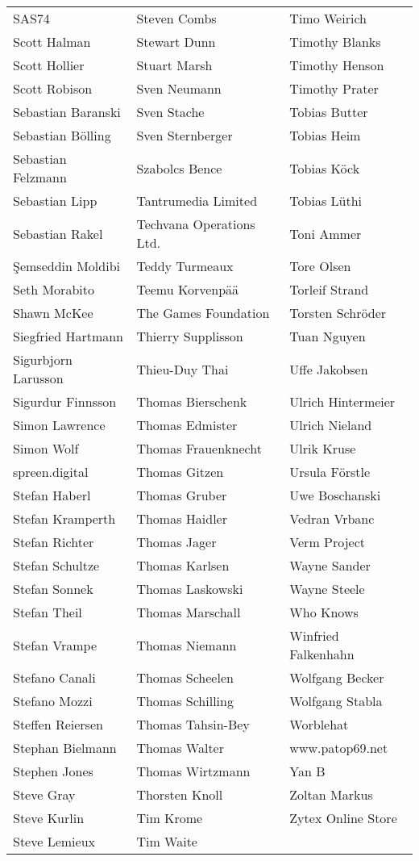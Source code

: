 \begin{tabular}{p{4.5cm}p{4.5cm}p{4.5cm}}
SAS74 & Steven Combs & Timo Weirich \\
Scott Halman & Stewart Dunn & Timothy Blanks \\
Scott Hollier & Stuart Marsh & Timothy Henson \\
Scott Robison & Sven Neumann & Timothy Prater \\
Sebastian Baranski & Sven Stache & Tobias Butter \\
Sebastian Bölling & Sven Sternberger & Tobias Heim \\
Sebastian Felzmann & Szabolcs Bence & Tobias Köck \\
Sebastian Lipp & Tantrumedia Limited & Tobias Lüthi \\
Sebastian Rakel & Techvana Operations Ltd. & Toni Ammer \\
Şemseddin Moldibi & Teddy Turmeaux & Tore Olsen \\
Seth Morabito & Teemu Korvenpää & Torleif Strand \\
Shawn McKee & The Games Foundation & Torsten Schröder \\
Siegfried Hartmann & Thierry Supplisson & Tuan Nguyen \\
Sigurbjorn Larusson & Thieu-Duy Thai & Uffe Jakobsen \\
Sigurdur Finnsson & Thomas Bierschenk & Ulrich Hintermeier \\
Simon Lawrence & Thomas Edmister & Ulrich Nieland \\
Simon Wolf & Thomas Frauenknecht & Ulrik Kruse \\
spreen.digital & Thomas Gitzen & Ursula Förstle \\
Stefan Haberl & Thomas Gruber & Uwe Boschanski \\
Stefan Kramperth & Thomas Haidler & Vedran Vrbanc \\
Stefan Richter & Thomas Jager & Verm Project \\
Stefan Schultze & Thomas Karlsen & Wayne Sander \\
Stefan Sonnek & Thomas Laskowski & Wayne Steele \\
Stefan Theil & Thomas Marschall & Who Knows \\
Stefan Vrampe & Thomas Niemann & Winfried Falkenhahn \\
Stefano Canali & Thomas Scheelen & Wolfgang Becker \\
Stefano Mozzi & Thomas Schilling & Wolfgang Stabla \\
Steffen Reiersen & Thomas Tahsin-Bey & Worblehat \\
Stephan Bielmann & Thomas Walter & www.patop69.net \\
Stephen Jones & Thomas Wirtzmann & Yan B \\
Steve Gray & Thorsten Knoll & Zoltan Markus \\
Steve Kurlin & Tim Krome & Zytex Online Store \\
Steve Lemieux & Tim Waite &         \\
\end{tabular}

